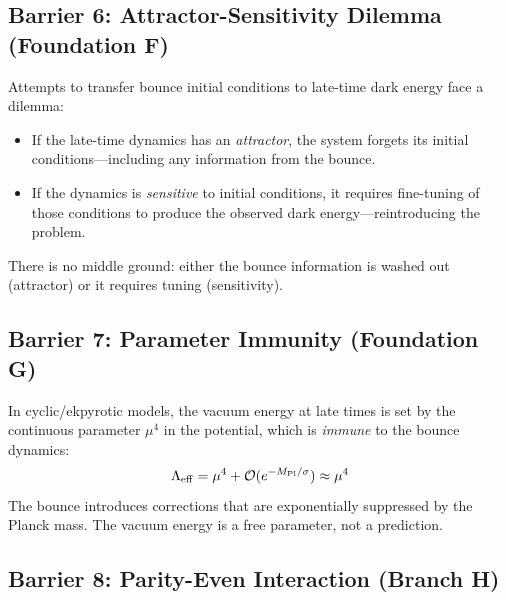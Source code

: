 \documentclass[aps,prd,twocolumn,superscriptaddress,showpacs,preprintnumbers,nofootinbib,longbibliography,floatfix]{revtex4-2}
\newcommand{\MPl}{M_{\rm Pl}}
\begin{document}
\subsection{Barrier 6: Attractor-Sensitivity Dilemma (Foundation F)}

Attempts to transfer bounce initial conditions to late-time dark energy face a dilemma:
\begin{itemize}
\item If the late-time dynamics has an \emph{attractor}, the system forgets its initial conditions---including any information from the bounce.
\item If the dynamics is \emph{sensitive} to initial conditions, it requires fine-tuning of those conditions to produce the observed dark energy---reintroducing the problem.
\end{itemize}
There is no middle ground: either the bounce information is washed out (attractor) or it requires tuning (sensitivity).

\subsection{Barrier 7: Parameter Immunity (Foundation G)}

In cyclic/ekpyrotic models, the vacuum energy at late times is set by the continuous parameter $\mu^4$ in the potential, which is \emph{immune} to the bounce dynamics:
\begin{equation}
\Lambda_{\rm eff} = \mu^4 + \mathcal{O}(e^{-\MPl/\sigma}) \approx \mu^4
\end{equation}
The bounce introduces corrections that are exponentially suppressed by the Planck mass. The vacuum energy is a free parameter, not a prediction.

\subsection{Barrier 8: Parity-Even Interaction (Branch H)}
\end{document}
